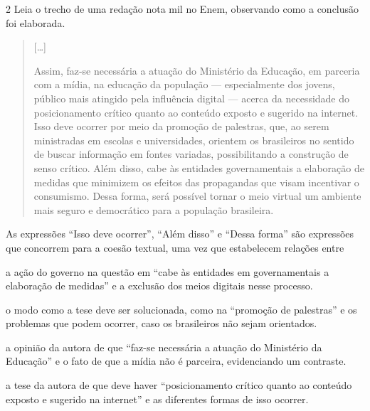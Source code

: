 \num{2} Leia o trecho de uma redação nota mil no Enem, observando como a
conclusão foi elaborada.


\begin{quote}
{[}\ldots{}{]}

Assim, faz-se necessária a atuação do Ministério da Educação, em
parceria com a mídia, na educação da população --- especialmente dos
jovens, público mais atingido pela influência digital --- acerca da
necessidade do posicionamento crítico quanto ao conteúdo exposto e
sugerido na internet. Isso deve ocorrer por meio da promoção de
palestras, que, ao serem ministradas em escolas e universidades,
orientem os brasileiros no sentido de buscar informação em fontes
variadas, possibilitando a construção de senso crítico. Além disso, cabe
às entidades governamentais a elaboração de medidas que minimizem os
efeitos das propagandas que visam incentivar o consumismo. Dessa forma,
será possível tornar o meio virtual um ambiente mais seguro e
democrático para a população brasileira.

\end{quote}

As expressões ``Isso deve ocorrer'', ``Além disso'' e ``Dessa forma''
são expressões que concorrem para a coesão textual, uma vez que
estabelecem relações entre

\begin{escolha}
\item a ação do governo na questão em ``cabe às entidades em
governamentais a elaboração de medidas'' e a exclusão dos meios digitais
nesse processo.

\item o modo como a tese deve ser solucionada, como na ``promoção de
palestras'' e os problemas que podem ocorrer, caso os brasileiros não
sejam orientados.

\item a opinião da autora de que ``faz-se necessária a atuação do
Ministério da Educação'' e o fato de que a mídia não é parceira,
evidenciando um contraste.

\item a tese da autora de que deve haver ``posicionamento crítico quanto
ao conteúdo exposto e sugerido na internet'' e as diferentes formas de
isso ocorrer.
\end{escolha}



